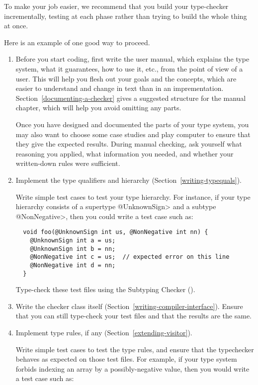 To make your job easier, we recommend that you build your type-checker
incrementally, testing at each phase rather than trying to build the whole
thing at once.

Here is an example of one good way to proceed.

\begin{enumerate}
\item
  Before you start coding, first write the user manual, which explains the
  type system, what it guarantees, how to use it, etc., from the point of
  view of a user.
  This will help you flesh out your goals and the concepts, which are
  easier to understand and change in text than in an imprementation.
  Section~\ref{documenting-a-checker} gives a suggested structure for the
  manual chapter, which will help you avoid omitting any parts.

  Once you have designed and documented the parts of your type system, you
  may also want to choose some case studies and play computer to ensure
  that they give the expected results.  During manual checking, ask
  yourself what reasoning you applied, what information you needed, and
  whether your written-down rules were sufficient.

\item
  Implement the type qualifiers and hierarchy
  (Section~\ref{writing-typequals}).

  Write simple test cases to test your type hierarchy.  For instance, if
  your type hierarchy consists of a supertype \<@UnknownSign> and a subtype
  \<@NonNegative>, then you could write a test case such as:

\begin{Verbatim}
  void foo(@UnknownSign int us, @NonNegative int nn) {
    @UnknownSign int a = us;
    @UnknownSign int b = nn;
    @NonNegative int c = us;  // expected error on this line
    @NonNegative int d = nn;
  }
\end{Verbatim}

  Type-check these test files using the Subtyping Checker
  ().

\item
  Write the checker class itself
  (Section~\ref{writing-compiler-interface}).
  Ensure that you can still type-check your test files and that the results
  are the same.

\item
  Implement type rules, if any (Section~\ref{extending-visitor}).

  Write simple test cases to test the type rules, and ensure that the
  typechecker behaves as expected on those test files.
  For example, if your type system forbids indexing an array by a
  possibly-negative value, then you would write a test case such as:


\end{enumerate}
